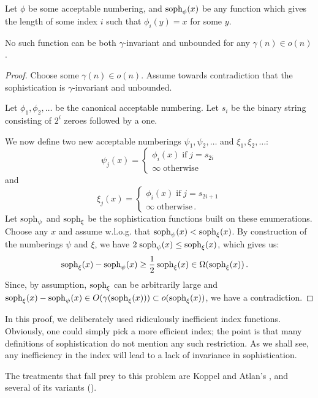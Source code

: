 \documentclass{style/llncs}
\newcommand{\tn}[1]{\textnormal{#1}}
\newcommand{\s}{\tn{soph}}
\newcommand{\num}[1]{#1_1, #1_2, \ldots}
\newcommand{\p}{\,\text{.}}
\begin{document}
\begin{lemma}
Let $\phi$ be some acceptable numbering, and $\s_\phi(x)$ be any function which gives the length of some index $i$ such that $\phi_i(y) = x$ for some $y$.

No such function can be both $\gamma$-invariant and unbounded for any $\gamma(n) \in o(n)$.
\end{lemma}
\begin{proof}
Choose some $\gamma(n) \in o(n)$. Assume towards contradiction that the sophistication is $\gamma$-invariant and unbounded.

Let $\num{\phi}$ be the canonical acceptable numbering. Let $s_i$ be the binary string consisting of $2^{i}$ zeroes followed by a one.

We now define two new acceptable numberings $\num{\psi}$ and $\num{\xi}$:
\[
\psi_j(x) = 
\begin{cases}
	\phi_i(x) \;\text{if}\; j = s_{2i}\\
	\infty\;\text{otherwise}
\end{cases}
\]
and 
\[
\xi_j(x) = 
\begin{cases}
	\phi_i(x) \;\text{if}\; j = s_{2i+1} \\
	\infty \;\text{otherwise}\p
\end{cases}
\]
Let $\s_\psi$ and $\s_\xi$ be the sophistication functions built on these enumerations. Choose any $x$ and assume w.l.o.g. that $\s_\psi(x) < \s_\xi(x)$. By construction of the numberings $\psi$ and $\xi$, we have $2\;\s_\psi(x)  \leq \s_\xi(x)$, which gives us:
\begin{align*}
	\s_\xi(x) - \s_\psi(x) &\geq \frac{1}{2}\, \s_\xi(x)  \in \Omega(\s_\xi(x))\p 
\end{align*}
Since, by assumption, $\s_\xi$ can be arbitrarily large and $\s_\xi(x) - \s_\psi(x) \in O(\gamma(\s_\xi(x))) \subset o(\s_\xi(x))$, we have a contradiction.
\end{proof}

In this proof, we deliberately used ridiculously inefficient index functions. Obviously, one could simply pick a more efficient index; the point is that many definitions of sophistication do not mention any such restriction. As we shall see, any inefficiency in the index will lead to a lack of invariance in sophistication.

The treatments that fall prey to this problem are Koppel and Atlan's \cite{koppelSoph1988,koppel1991almost},  and several of its variants (\cite{antunes2009sophistication,antunes2013sophistication}). 
\end{document}
